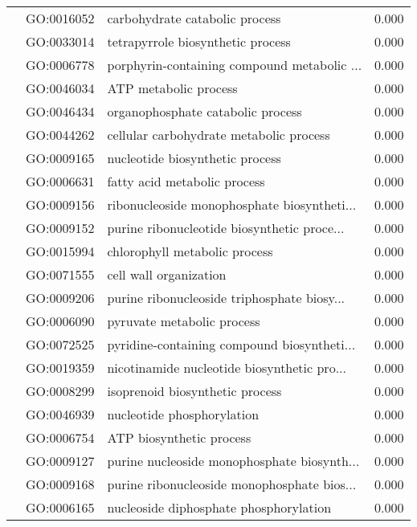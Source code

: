 \begin{longtable}{lllr}
   & GO:0016052 &               carbohydrate catabolic process &         0.000 \\
   & GO:0033014 &            tetrapyrrole biosynthetic process &         0.000 \\
   & GO:0006778 &  porphyrin-containing compound metabolic ... &         0.000 \\
   & GO:0046034 &                        ATP metabolic process &         0.000 \\
   & GO:0046434 &            organophosphate catabolic process &         0.000 \\
   & GO:0044262 &      cellular carbohydrate metabolic process &         0.000 \\
   & GO:0009165 &              nucleotide biosynthetic process &         0.000 \\
   & GO:0006631 &                 fatty acid metabolic process &         0.000 \\
   & GO:0009156 &  ribonucleoside monophosphate biosyntheti... &         0.000 \\
   & GO:0009152 &  purine ribonucleotide biosynthetic proce... &         0.000 \\
   & GO:0015994 &                chlorophyll metabolic process &         0.000 \\
   & GO:0071555 &                       cell wall organization &         0.000 \\
   & GO:0009206 &  purine ribonucleoside triphosphate biosy... &         0.000 \\
   & GO:0006090 &                   pyruvate metabolic process &         0.000 \\
   & GO:0072525 &  pyridine-containing compound biosyntheti... &         0.000 \\
   & GO:0019359 &  nicotinamide nucleotide biosynthetic pro... &         0.000 \\
   & GO:0008299 &              isoprenoid biosynthetic process &         0.000 \\
   & GO:0046939 &                   nucleotide phosphorylation &         0.000 \\
   & GO:0006754 &                     ATP biosynthetic process &         0.000 \\
   & GO:0009127 &  purine nucleoside monophosphate biosynth... &         0.000 \\
   & GO:0009168 &  purine ribonucleoside monophosphate bios... &         0.000 \\
   & GO:0006165 &       nucleoside diphosphate phosphorylation &         0.000 \\

\end{longtable}
